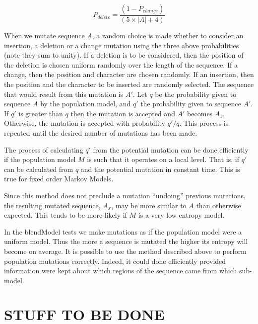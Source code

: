 \documentclass[letterpaper,11pt,oneside]{article}
\begin{document}
$$P_{delete} = \frac{(1-P_{change})}{(5\times|A|+4)}$$

When we mutate sequence $A$, a random choice is made whether to consider an
insertion, a deletion or a change mutation using the three above probabilities
(note they sum to unity).  If a deletion is to be considered, then the
position of the deletion is chosen uniform randomly over the length of the
sequence.  If a change, then the position and character are chosen randomly.
If an insertion, then the position and the character to be inserted are
randomly selected.  The sequence that would result from this mutation is $A'$.
Let $q$ be the probability given to sequence $A$ by the population model, and
$q'$ the probability given to sequence $A'$.  If $q'$ is greater than $q$ then
the mutation is accepted and $A'$ becomes $A_1$.  Otherwise, the mutation is
accepted with probability $q'/q$.  This process is repeated until the desired
number of mutations has been made.

The process of calculating $q'$ from the potential mutation can be done
efficiently if the population model $M$ is such that it operates on a local
level.  That is, if $q'$ can be calculated from $q$ and the potential mutation
in constant time.  This is true for fixed order Markov Models.

Since this method does not preclude a mutation ``undoing'' previous mutations,
the resulting mutated sequence, $A_x$, may be more similar to $A$ than
otherwise expected.  This tends to be more likely if $M$ is a very low entropy
model.

In the blendModel tests we make mutations as if the population model were a
uniform model.  Thus the more a sequence is mutated the higher its entropy
will become on average.  It is possible to use the method described above to
perform population mutations correctly.  Indeed, it could done efficiently
provided information were kept about which regions of the sequence came from
which sub-model.


\section{STUFF TO BE DONE} 
\end{document}
